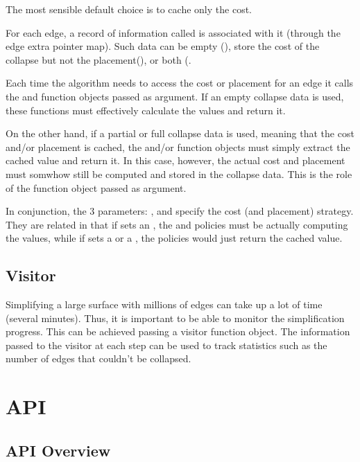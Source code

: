 The most sensible default choice is to cache only the cost.

For each edge, a record of information called  is associated with it (through the edge extra pointer map). Such data can be empty (), store the cost of the collapse but not the placement(), or both (.

Each time the algorithm needs to access the cost or placement for an edge it calls the  and  function objects passed as argument. If an empty collapse data is used, these functions must effectively calculate the values and return it.

On the other hand, if a partial or full collapse data is used, meaning that the cost and/or placement is cached, the  and/or  function objects must simply extract the cached value and return it. In this case, however, the actual cost and placement must somwhow still be computed and stored in the collapse data. This is the role of the  function object passed as argument.

In conjunction, the 3 parameters: ,  and  specify the cost (and placement) strategy. They are related in that if  sets an , the  and  policies must be actually computing the values, while if  sets a  or a , the policies would just return the cached value.

\subsection{Visitor}

Simplifying a large surface with millions of edges can take up a lot of time (several minutes). Thus, it is important to be able to monitor the simplification progress. This can be achieved passing a visitor function object. The information passed to the visitor at each step can be used to track statistics such as the number of edges that couldn't be collapsed.

\section{API}

\subsection{API Overview}

